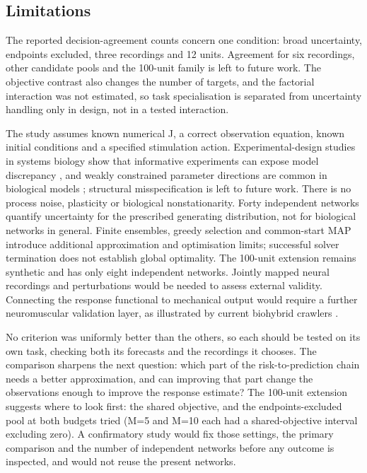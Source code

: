 \subsection{Limitations}

The reported decision-agreement counts concern one condition: broad uncertainty, endpoints excluded, three recordings and 12 units. Agreement for six recordings, other candidate pools and the 100-unit family is left to future work. The objective contrast also changes the number of targets, and the factorial interaction was not estimated, so task specialisation is separated from uncertainty handling only in design, not in a tested interaction.

The study assumes known numerical J, a correct observation equation, known initial conditions and a specified stimulation action. Experimental-design studies in systems biology show that informative experiments can expose model discrepancy \cite{ref13}, and weakly constrained parameter directions are common in biological models \cite{ref29}; structural misspecification is left to future work. There is no process noise, plasticity or biological nonstationarity. Forty independent networks quantify uncertainty for the prescribed generating distribution, not for biological networks in general. Finite ensembles, greedy selection and common-start MAP introduce additional approximation and optimisation limits; successful solver termination does not establish global optimality. The 100-unit extension remains synthetic and has only eight independent networks. Jointly mapped neural recordings and perturbations would be needed to assess external validity. Connecting the response functional to mechanical output would require a further neuromuscular validation layer, as illustrated by current biohybrid crawlers \cite{ref02,ref27}.

No criterion was uniformly better than the others, so each should be tested on its own task, checking both its forecasts and the recordings it chooses. The comparison sharpens the next question: which part of the risk-to-prediction chain needs a better approximation, and can improving that part change the observations enough to improve the response estimate? The 100-unit extension suggests where to look first: the shared objective, and the endpoints-excluded pool at both budgets tried (M=5 and M=10 each had a shared-objective interval excluding zero). A confirmatory study would fix those settings, the primary comparison and the number of independent networks before any outcome is inspected, and would not reuse the present networks.

